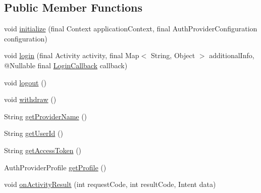 \subsection*{Public Member Functions}
\begin{DoxyCompactItemize}
\item 
void \hyperlink{interfacecom_1_1toast_1_1android_1_1gamebase_1_1base_1_1auth_1_1_auth_provider_a923c7de30b5d052e5d108dbdf5aee7c9}{initialize} (final Context application\+Context, final Auth\+Provider\+Configuration configuration)
\item 
void \hyperlink{interfacecom_1_1toast_1_1android_1_1gamebase_1_1base_1_1auth_1_1_auth_provider_a65d305c7970261995b0507854ee39714}{login} (final Activity activity, final Map$<$ String, Object $>$ additional\+Info, @Nullable final \hyperlink{interfacecom_1_1toast_1_1android_1_1gamebase_1_1base_1_1auth_1_1_auth_provider_1_1_login_callback}{Login\+Callback} callback)
\item 
void \hyperlink{interfacecom_1_1toast_1_1android_1_1gamebase_1_1base_1_1auth_1_1_auth_provider_a1af55df87e37292a150f183f1307ac43}{logout} ()
\item 
void \hyperlink{interfacecom_1_1toast_1_1android_1_1gamebase_1_1base_1_1auth_1_1_auth_provider_aafa8642d1e3cd871c8fee9462212f95d}{withdraw} ()
\item 
String \hyperlink{interfacecom_1_1toast_1_1android_1_1gamebase_1_1base_1_1auth_1_1_auth_provider_ae151df64ed9709b56ffeba6ae4fe8c14}{get\+Provider\+Name} ()
\item 
String \hyperlink{interfacecom_1_1toast_1_1android_1_1gamebase_1_1base_1_1auth_1_1_auth_provider_a1a86b0102452494152fce9535952e4f4}{get\+User\+Id} ()
\item 
String \hyperlink{interfacecom_1_1toast_1_1android_1_1gamebase_1_1base_1_1auth_1_1_auth_provider_ae5d68509be41985a7f70a8fb907a576a}{get\+Access\+Token} ()
\item 
Auth\+Provider\+Profile \hyperlink{interfacecom_1_1toast_1_1android_1_1gamebase_1_1base_1_1auth_1_1_auth_provider_a5f70d0f45000c4b1a07474f3a4aba952}{get\+Profile} ()
\item 
void \hyperlink{interfacecom_1_1toast_1_1android_1_1gamebase_1_1base_1_1auth_1_1_auth_provider_a3bc85abb35d480f743e4b74d5de3d549}{on\+Activity\+Result} (int request\+Code, int result\+Code, Intent data)
\end{DoxyCompactItemize}
